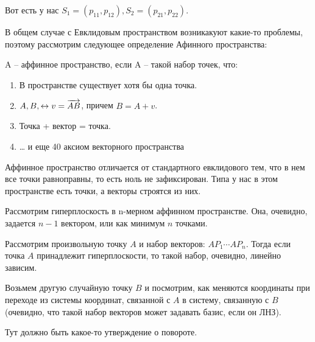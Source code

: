 \documentclass[11pt]{article}
\begin{document}
Вот есть у нас \(S_{1}=(p_{11},p_{12}), S_{2}=(p_{21},p_{22})\).

В общем случае с Евклидовым пространством возникакуют какие-то
проблемы, поэтому рассмотрим следующее определение Афинного
пространства:

A -- аффинное пространство, если A -- такой набор точек, что:
\begin{enumerate}
\item В пространстве существует хотя бы одна точка.
\item \(A, B, \leftrightarrow v = \overrightarrow{A B}\), причем \(B = A + v\).
\item Точка + вектор = точка.
\item \ldots{} и еще 40 аксиом векторного пространства
\end{enumerate}

Аффинное пространство отличается от стандартного евклидового тем,
что в нем все точки равноправны, то есть ноль не зафиксирован. Типа
у нас в этом пространстве есть точки, а векторы строятся из них.

Рассмотрим гиперплоскость в n-мерном аффинном пространстве. Она,
очевидно, задается $n-1$ вектором, или как минимум $n$ точками.

Рассмотрим произвольную точку $A$ и набор векторов: $AP_1 \cdots
  AP_n$. Тогда если точка $A$ принадлежит гиперплоскости, то такой
набор, очевидно, линейно зависим.

Возьмем другую случайную точку $B$ и посмотрим, как меняются
координаты при переходе из системы координат, связанной с $A$ в
систему, связанную с $B$ (очевидно, что такой набор векторов может
задавать базис, если он ЛНЗ).

\begin{thm}[О повороте]
Тут должно быть какое-то утверждение о повороте.
\end{thm}
\end{document}
